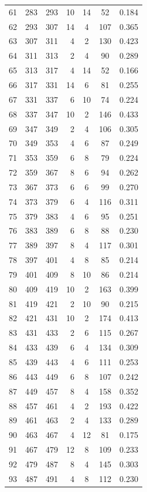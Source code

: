 \documentclass[12pt]{article}
\theoremstyle{plain}
\theoremstyle{definition}
\theoremstyle{remark}
\begin{document}
\begin{center}
\begin{small}
\begin{longtable}{@{}crrrccc@{}}
61 & 283 & 293 & 10 & 14 & 52 & 0.184 \\
62 & 293 & 307 & 14 & 4 & 107 & 0.365 \\
63 & 307 & 311 & 4 & 2 & 130 & 0.423 \\
64 & 311 & 313 & 2 & 4 & 90 & 0.289 \\
65 & 313 & 317 & 4 & 14 & 52 & 0.166 \\
66 & 317 & 331 & 14 & 6 & 81 & 0.255 \\
67 & 331 & 337 & 6 & 10 & 74 & 0.224 \\
68 & 337 & 347 & 10 & 2 & 146 & 0.433 \\
69 & 347 & 349 & 2 & 4 & 106 & 0.305 \\
70 & 349 & 353 & 4 & 6 & 87 & 0.249 \\
71 & 353 & 359 & 6 & 8 & 79 & 0.224 \\
72 & 359 & 367 & 8 & 6 & 94 & 0.262 \\
73 & 367 & 373 & 6 & 6 & 99 & 0.270 \\
74 & 373 & 379 & 6 & 4 & 116 & 0.311 \\
75 & 379 & 383 & 4 & 6 & 95 & 0.251 \\
76 & 383 & 389 & 6 & 8 & 88 & 0.230 \\
77 & 389 & 397 & 8 & 4 & 117 & 0.301 \\
78 & 397 & 401 & 4 & 8 & 85 & 0.214 \\
79 & 401 & 409 & 8 & 10 & 86 & 0.214 \\
80 & 409 & 419 & 10 & 2 & 163 & 0.399 \\
81 & 419 & 421 & 2 & 10 & 90 & 0.215 \\
82 & 421 & 431 & 10 & 2 & 174 & 0.413 \\
83 & 431 & 433 & 2 & 6 & 115 & 0.267 \\
84 & 433 & 439 & 6 & 4 & 134 & 0.309 \\
85 & 439 & 443 & 4 & 6 & 111 & 0.253 \\
86 & 443 & 449 & 6 & 8 & 107 & 0.242 \\
87 & 449 & 457 & 8 & 4 & 158 & 0.352 \\
88 & 457 & 461 & 4 & 2 & 193 & 0.422 \\
89 & 461 & 463 & 2 & 4 & 133 & 0.289 \\
90 & 463 & 467 & 4 & 12 & 81 & 0.175 \\
91 & 467 & 479 & 12 & 8 & 109 & 0.233 \\
92 & 479 & 487 & 8 & 4 & 145 & 0.303 \\
93 & 487 & 491 & 4 & 8 & 112 & 0.230 \\

\end{longtable}
\end{small}
\end{center}
\end{document}
